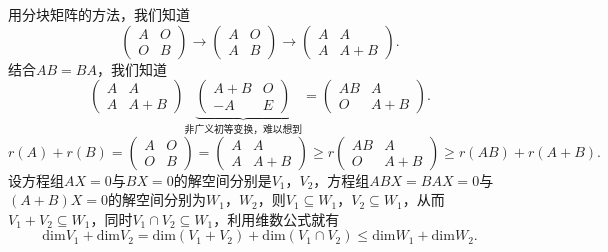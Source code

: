 \documentclass{article}
\begin{document}
用分块矩阵的方法，我们知道
\begin{equation*}
    \left(
    \begin{array}{cc}
        A & O \\
        O & B
    \end{array}
    \right)
    \longrightarrow
    \left(
    \begin{array}{cc}
        A & O \\
        A & B
    \end{array}
    \right)
    \longrightarrow
    \left(
    \begin{array}{cc}
        A & A     \\
        A & A + B
    \end{array}
    \right).
\end{equation*}
结合$AB = BA$，我们知道
\begin{equation*}
    \left(
    \begin{array}{cc}
            A & A     \\
            A & A + B
        \end{array}
    \right)
    \underbrace{\left(              %
        \begin{array}{cc}
            A + B & O \\
            -A    & E
        \end{array}
        \right)}_{\text{非广义初等变换，难以想到}}
    =
    \left(
    \begin{array}{cc}
            AB & A     \\
            O  & A + B
        \end{array}
    \right).
\end{equation*}
\begin{equation*}
    r \left(A\right) + r \left(B\right)
    =
    \left(
    \begin{array}{cc}
        A & O \\
        O & B
    \end{array}
    \right)
    =
    \left(
    \begin{array}{cc}
        A & A     \\
        A & A + B
    \end{array}
    \right)
    \ge
    r \left(
    \begin{array}{cc}
        AB & A     \\
        O  & A + B
    \end{array}
    \right)
    \ge
    r \left(AB\right) + r \left(A + B\right).
\end{equation*}
设方程组$AX = 0$与$BX = 0$的解空间分别是$V_1$，$V_2$，方程组$ABX = BAX = 0$与$\left(A + B\right)X = 0$的解空间分别为$W_1$，$W_2$，则$V_1\subseteq W_1$，$V_2\subseteq W_1$，从而$V_1 + V_2\subseteq W_1$，同时$V_1\cap V_2 \subseteq W_1$，利用维数公式就有
\begin{equation*}
    \mathrm{dim}V_1 + \mathrm{dim}V_2 = \mathrm{dim}\left(V_1 + V_2\right) + \mathrm{dim}\left(V_1 \cap V_2\right) \le \mathrm{dim}W_1 + \mathrm{dim}W_2.
\end{equation*}
\end{document}
